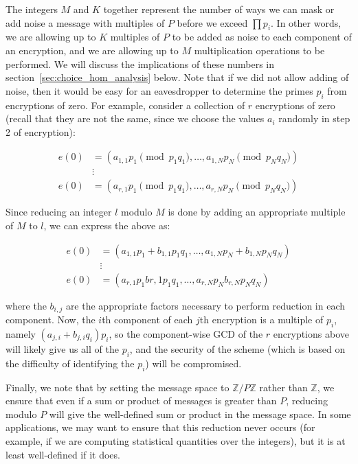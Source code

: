 \documentclass[11pt]{report}
\newcommand{\Z}{\mathbb{Z}}
\begin{document}
The integers $M$ and $K$ together represent the number of ways we can mask or add noise a message with multiples of $P$ before we exceed $\prod p_i$. In other words, we are allowing up to $K$ multiples of $P$ to be added as noise to each component of an encryption, and we are allowing up to $M$ multiplication operations to be performed. We will discuss the implications of these numbers in section~\ref{sec:choice_hom_analysis} below. Note that if we did not allow adding of noise, then it would be easy for an eavesdropper to determine the primes $p_i$ from encryptions of zero. For example, consider a collection of $r$ encryptions of zero (recall that they are not the same, since we choose the values $a_i$ randomly in step 2 of encryption):

\begin{align*}
e(0) &=  (a_{1,1}p_1 \pmod{p_1q_1},\dots,a_{1,N}p_N \pmod{p_Nq_N}) \\
\ &\vdots \ \\
e(0) &= (a_{r,1}p_1 \pmod{p_1q_1},\dots,a_{r,N}p_N \pmod{p_Nq_N})
\end{align*}

\noindent Since reducing an integer $l$ modulo $M$ is done by adding an appropriate multiple of $M$ to $l$, we can express the above as:

\begin{align*}
e(0) &= (a_{1,1}p_1+b_{1,1}p_1q_1,\dots,a_{1,N}p_N + b_{1,N}p_Nq_N) \\
\ &\vdots \\
e(0) &= (a_{r,1}p_1 b{r,1}p_1q_1,\dots,a_{r,N}p_N b_{r,N}p_Nq_N)
\end{align*}

\noindent where the $b_{i,j}$ are the appropriate factors necessary to perform reduction in each component. Now, the $i$th component of each $j$th encryption is a multiple of $p_i$, namely $(a_{j,i}+b_{j,i}q_i)p_i$, so the component-wise GCD of the $r$ encryptions above will likely give us all of the $p_i$, and the security of the scheme (which is based on the difficulty of identifying the $p_i$) will be compromised.

Finally, we note that by setting the message space to $\Z/P\Z$ rather than $\Z$, we ensure that even if a sum or product of messages is greater than $P$, reducing modulo $P$ will give the well-defined sum or product in the message space. In some applications, we may want to ensure that this reduction never occurs (for example, if we are computing statistical quantities over the integers), but it is at least well-defined if it does.
\end{document}
